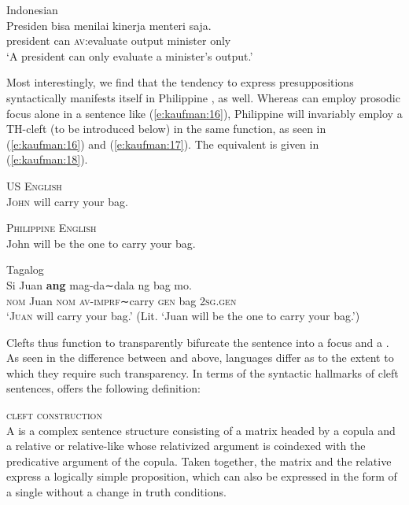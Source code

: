 \documentclass[output=paper]{langsci/langscibook}
\begin{document}
\begin{exe}
	\ex\label{e:kaufman:15}{Indonesian}\\
	\gll Presiden bisa menilai kinerja menteri saja.\\
	president can \textsc{av:}evaluate output minister only\\
	\glt `A president can only evaluate a minister's output.'
\end{exe}

\noindent
Most interestingly, we find that the  tendency to express presuppositions syntactically manifests itself in Philippine , as well. Whereas  can employ prosodic focus alone in a sentence like (\ref{e:kaufman:16}), Philippine  will invariably employ a TH-cleft (to be introduced below) in the same function, as seen in (\ref{e:kaufman:16}) and (\ref{e:kaufman:17}). The  equivalent is given in (\ref{e:kaufman:18}).

\begin{exe}
	\ex\label{e:kaufman:16}{\textsc{US English}}\\
	\textsc{John} will carry your bag.
\end{exe}

\begin{exe}
	\ex\label{e:kaufman:17}{\textsc{Philippine English}}\\
	John will be the one to carry your bag.
\end{exe}

\begin{exe}
	\ex\label{e:kaufman:18}{Tagalog}\\
	\gll Si Juan \textbf{ang} mag-da∼dala ng bag mo.\\
	\textsc{nom} Juan \textsc{nom} \textsc{av-imprf∼}carry \textsc{gen} bag \textsc{2sg.gen}\\
	\glt `\textsc{Juan} will carry your bag.' (Lit. `Juan will be the one to carry your bag.')
\end{exe}

\noindent
Clefts thus function to transparently bifurcate the sentence into a focus and a . As seen in the difference between  and  above, languages differ as to the extent to which they require such transparency. In terms of the syntactic hallmarks of cleft sentences,  \citet{Lambrecht:2001} offers the following definition:

\begin{exe}
	\ex\label{e:kaufman:19} {\textsc{cleft construction} \citep[467]{Lambrecht:2001}} \\
	A  is a complex sentence structure consisting of a matrix  headed by a copula and a relative or relative-like  whose relativized argument is coindexed with the predicative argument of the copula. Taken together, the matrix and the relative express a logically simple proposition, which can also be expressed in the form of a single  without a change in truth conditions.
\end{exe}
\end{document}
